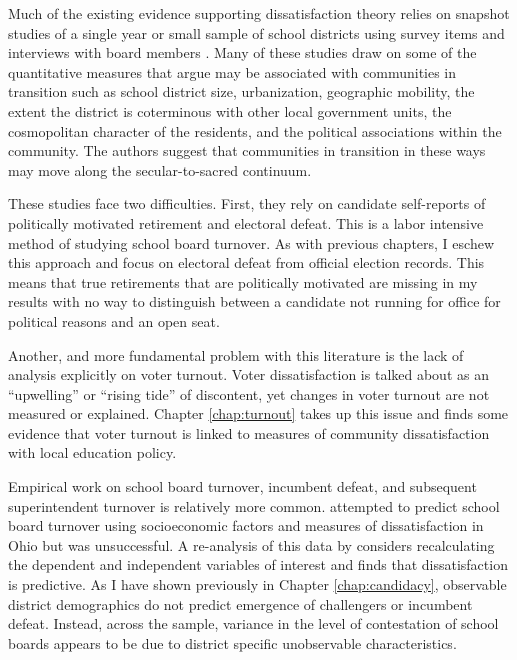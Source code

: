 Much of the existing evidence supporting dissatisfaction theory relies on snapshot 
studies of a single year or small sample of school districts using survey items 
and interviews with board members \citep{RefWorks:311,RefWorks:245,RefWorks:247,RefWorks:341}. Many of these studies draw on some of the quantitative measures 
that \citet{RefWorks:297} argue may be associated with communities in transition such as school district size, urbanization, geographic mobility, the extent the district 
is coterminous with other local government units, the cosmopolitan character of 
the residents, and the political associations within the community. The authors 
suggest that communities in transition in these ways may move along the 
secular-to-sacred continuum. 

These studies face two difficulties. First, they rely on candidate self-reports 
of politically motivated retirement and electoral defeat. This is a labor intensive 
method of studying school board turnover. As with previous chapters, I eschew this 
approach and focus on electoral defeat from official election records. This means 
that true retirements that are politically motivated are missing in my results with 
no way to distinguish between a candidate not running for office for political reasons 
and an open seat. 

Another, and more fundamental problem with this literature is the lack of analysis 
explicitly on voter turnout. Voter dissatisfaction is talked about as an 
``upwelling'' or ``rising tide'' of discontent, yet changes in voter turnout are 
not measured or explained. Chapter \ref{chap:turnout} takes up this issue and 
finds some evidence that voter turnout is linked to measures of community 
dissatisfaction with local education policy. 

Empirical work on school board turnover, incumbent defeat, and subsequent 
superintendent turnover is relatively more common. \citet{RefWorks:259} attempted 
to predict school board turnover using socioeconomic factors and measures of 
dissatisfaction in Ohio but was unsuccessful. A re-analysis of this data by 
\citet{RefWorks:337} considers recalculating the dependent and independent 
variables of interest and finds that dissatisfaction is predictive. As I have 
shown previously in Chapter \ref{chap:candidacy}, observable district 
demographics do not predict emergence of challengers or incumbent defeat. Instead, across the sample, variance in the level of contestation of school boards appears 
to be due to district specific unobservable characteristics.

